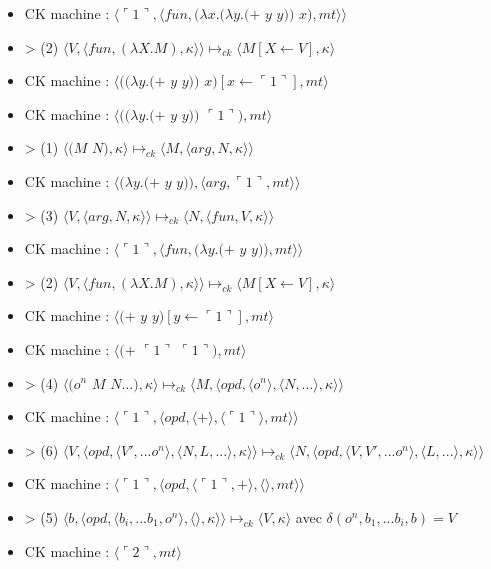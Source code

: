 \documentclass[10pt,a4paper]{report}
\begin{document}
\begin{itemize}
\item[] CK machine : $\langle\ulcorner 1\urcorner,\langle fun,(\lambda x.(\lambda y.(+$ $y$ $y))$ $x),mt\rangle\rangle$
\item[] > (2) $\langle V,\langle fun,(\lambda X.M),\kappa \rangle \rangle \longmapsto_{ck} \langle M[X \leftarrow V],\kappa\rangle$		
\item[] CK machine : $\langle((\lambda y.(+$ $y$ $y))$ $x)[x \leftarrow \ulcorner 1\urcorner ],mt\rangle$
\item[] CK machine : $\langle((\lambda y.(+$ $y$ $y))$ $\ulcorner 1\urcorner),mt\rangle$
\item[] > (1) $\langle(M$ $N),\kappa\rangle \longmapsto_{ck} \langle M,\langle arg,N,\kappa\rangle\rangle$
\item[] CK machine : $\langle(\lambda y.(+$ $y$ $y)),\langle arg,\ulcorner 1\urcorner,mt\rangle\rangle$	
\item[] > (3) $\langle V,\langle arg,N,\kappa \rangle \rangle \longmapsto_{ck} \langle N,\langle fun,V,\kappa \rangle \rangle$
\item[] CK machine : $\langle\ulcorner 1\urcorner,\langle fun,(\lambda y.(+$ $y$ $y)),mt\rangle\rangle$	
\item[] > (2) $\langle V,\langle fun,(\lambda X.M),\kappa \rangle \rangle \longmapsto_{ck} \langle M[X \leftarrow V],\kappa\rangle$	
\item[] CK machine : $\langle(+$ $y$ $y)[y \leftarrow\ulcorner 1\urcorner],mt\rangle$
\item[] CK machine : $\langle(+$ $\ulcorner 1\urcorner$ $\ulcorner 1\urcorner),mt\rangle$
\item[] > (4) $\langle(o^{n}$ $M$ $N...),\kappa\rangle \longmapsto_{ck} \langle M,\langle opd,\langle o^{n}\rangle,\langle N,...\rangle,\kappa\rangle\rangle$
\item[] CK machine : $\langle\ulcorner 1\urcorner,\langle opd,\langle + \rangle,\langle\ulcorner 1\urcorner\rangle,mt\rangle\rangle$
\item[] > (6) $\langle V,\langle opd,\langle V',...o^{n}\rangle,\langle N,L,...\rangle,\kappa\rangle\rangle \longmapsto_{ck} \langle N,\langle opd,\langle V,V',...o^{n}\rangle,\langle L,...\rangle,\kappa\rangle\rangle$
\item[] CK machine : $\langle\ulcorner 1\urcorner,\langle opd,\langle\ulcorner 1\urcorner,+ \rangle,\langle\rangle,mt\rangle\rangle$
\item[] > (5) $\langle b,\langle opd,\langle b_{i},...b_{1},o^{n}\rangle,\langle\rangle,\kappa\rangle\rangle \longmapsto_{ck} \langle V,\kappa\rangle$ avec $\delta(o^{n},b_{1},...b_{i},b) = V$
\item[] CK machine : $\langle\ulcorner 2\urcorner,mt\rangle$
\end{itemize}
\newpage
\end{document}
